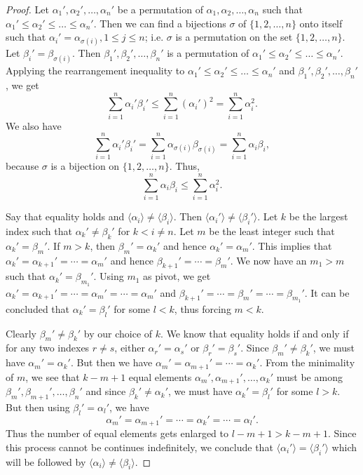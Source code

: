 \begin{proof}
  Let $\alpha_1', \alpha_2', \ldots, \alpha_n'$ be a permutation of $\alpha_1, \alpha_2, \ldots, \alpha_n$ such that
  $\alpha_1'\leq\alpha_2'\leq\ldots\leq\alpha_n'$. Then we can find a bijections $\sigma$ of $\{1,2,\ldots,n\}$ onto itself such
  that $\alpha_i' = \alpha_{\sigma(i)}, 1\leq j\leq n$; i.e. $\sigma$ is a permutation on the set $\{1,2,\ldots, n\}$. Let
  $\beta_i' = \beta_{\sigma(i)}$. Then $\beta_1', \beta_2', \ldots, \beta_n'$ is a permutation of
  $\alpha_1'\leq\alpha_2'\leq\ldots\leq\alpha_n'$. Applying the rearrangement inequality to
  $\alpha_1'\leq\alpha_2'\leq\ldots\leq\alpha_n'$ and $\beta_1', \beta_2', \ldots, \beta_n'$, we get
  $$\sum_{i=1}^n\alpha_i'\beta_i'\leq\sum_{i=1}^n(\alpha_i')^2 = \sum_{i=1}^n\alpha_i^2.$$
  We also have $$\sum_{i=1}^n\alpha_i'\beta_i' = \sum_{i=1}^n\alpha_{\sigma(i)}\beta_{\sigma(i)} = \sum_{i=1}^n\alpha_i\beta_i,$$
  because $\sigma$ is a bijection on $\{1,2,\ldots,n\}$. Thus,
  $$\sum_{i=1}^n\alpha_i\beta_i\leq\sum_{i=1}^n\alpha_i^2.$$

  Say that equality holds and $\langle\alpha_i\rangle\neq\langle\beta_i\rangle$. Then
  $\langle\alpha_i'\rangle\neq\langle\beta_i'\rangle$. Let $k$ be the largest index such that $\alpha_k'\neq\beta_k'$ for $k <
  i\neq n$. Let $m$ be the least integer such that $\alpha_k' = \beta_m'$. If $m>k$, then $\beta_m' = \alpha_k'$ and hence
  $\alpha_k' = \alpha_m'$. This implies that $\alpha_k' = \alpha_{k+1}' = \cdots = \alpha_m'$ and hence $\beta_{k+1}' = \cdots =
  \beta_m'$. We now have an $m_1 > m$ such that $\alpha_k' = \beta_{m_1}'$. Using $m_1$ as pivot, we get $\alpha_k' = \alpha_{k+1}'
  = \cdots = \alpha_m' = \cdots = \alpha_m'$ and $\beta_{k+1}' = \cdots = \beta_m' = \cdots = \beta_{m_1}'$. It can be concluded
  that $\alpha_k' = \beta_l'$ for some $l<k$, thus forcing $m < k$.

  Clearly $\beta_m'\neq\beta_k'$ by our choice of $k$. We know that equality holds if and only if for any two indexes $r\neq s$,
  either $\alpha_r' = \alpha_s'$ or $\beta_r' = \beta_s'$. Since $\beta_m'\neq\beta_k'$, we must have $\alpha_m' = \alpha_k'$. But
  then we have $\alpha_m' = \alpha_{m+1}' = \cdots = \alpha_k'$. From the minimality of $m$, we see that $k - m + 1$ equal elements
  $\alpha_m', \alpha_{m+1}', \ldots, \alpha_k'$ must be among $\beta_m', \beta_{m+1}', \ldots, \beta_n'$ and since
  $\beta_k'\neq\alpha_k'$, we must have $\alpha_k' = \beta_l'$ for some $l > k$. But then using $\beta_l' = \alpha_l'$, we have
  $$\alpha_m' = \alpha_{m+1}' = \cdots = \alpha_k' = \cdots = \alpha_l'.$$
  Thus the number of equal elements gets enlarged to $l - m + 1 > k -m + 1$. Since this process cannot be continues indefinitely,
  we conclude that $\langle\alpha_i'\rangle = \langle\beta_i'\rangle$ which will be followed
  by $\langle\alpha_i\rangle\neq\langle\beta_i\rangle$.
\end{proof}

